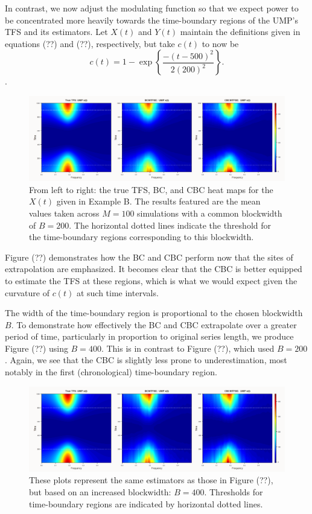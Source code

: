 \documentclass{article}
\begin{document}
In contrast, we now adjust the modulating function so that we expect power to be concentrated more heavily towards the time-boundary regions of the UMP's TFS and its estimators. Let $X(t)$ and $Y(t)$ maintain the definitions given in equations (??) and (??), respectively, but take $c(t)$ to now be
\begin{equation*}
    c(t) = 1 - \exp\left\{\frac{-(t-500)^2}{2(200)^2}\right\}.
\end{equation*}.

\begin{figure}
    \centering
    \includegraphics[width = \linewidth]{Fig/sgrams_UMP_B200_rev_letterbox.png}
    \caption{From left to right: the true TFS, BC, and CBC heat maps for the $X(t)$ given in Example B. The results featured are the mean values taken across $M=100$ simulations with a common blockwidth of $B=200$. The horizontal dotted lines indicate the threshold for the time-boundary regions corresponding to this blockwidth.}
    \label{fig:enter-label}
\end{figure}

Figure (??) demonstrates how the BC and CBC perform now that the sites of extrapolation are emphasized. It becomes clear that the CBC is better equipped to estimate the TFS at these regions, which is what we would expect given the curvature of $c(t)$ at such time intervals. 

The width of the time-boundary region is proportional to the chosen blockwidth $B$. To demonstrate how effectively the BC and CBC extrapolate over a greater period of time, particularly in proportion to original series length, we produce Figure (??) using $B=400$. This is in contrast to Figure (??), which used $B=200$. Again, we see that the CBC is slightly less prone to underestimation, most notably in the first (chronological) time-boundary region.

\begin{figure}[h!]
    \centering
    \includegraphics[width = \linewidth]{Fig/sgrams_UMP_B400_rev_letterbox.png}
    \caption{These plots represent the same estimators as those in Figure (??), but based on an increased blockwidth: $B=400$. Thresholds for time-boundary regions are indicated by horizontal dotted lines.}
    \label{fig:enter-label}
\end{figure}
\end{document}
